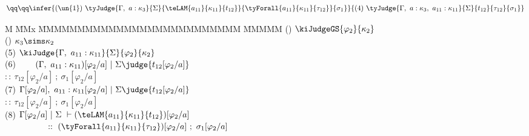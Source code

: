 \begin{flushleft}
\bigskip
$$
\qq \qq	\infer
	{ (\un{1}) \
	  \tyJudge
		{\Gamma, \ a : \kappa_3}
		{\Sigma}
		{\teLAM{a_{11}}{\kappa_{11}}{t_{12}}}
		{\tyForall{a_{11}}{\kappa_{11}}{\tau_{12}}}
		{\sigma_1}
	}
	{ (4) \
	  \tyJudge
	  	{\Gamma, \ a : \kappa_3, \ a_{11} : \kappa_{11}}
		{\Sigma}
		{t_{12}}
		{\tau_{12}}
		{\sigma_1}
	}
$$
\begin{tabbing}
M \= MMx \= MMMMMMMMMMMMMMMMMMMMMMMMMM \= MMMMM  \kill
\>	(\un{2}) 
		\> $\kiJudgeGS{\varphi_2}{\kappa_2}$
		\> 
\\[1ex]
\>	() 
		\> $\kappa_3 \sims \kappa_2$
		\> 
\\[1ex]
\>	(5) 	\> $\kiJudge
			{\Gamma, \ a_{11} : \kappa_{11}}
			{\Sigma}
			{\varphi_2}
			{\kappa_2}$
		\> 
\\[1ex]
\>	(6) 	\> $\ \ \ \ \ \: 
			{(\Gamma, \  a_{11} : \kappa_{11})[\varphi_2/a]} 
			\ \vert \ 	{\Sigma} 
			\judge 		{t_{12}[\varphi_2/a]}$
\\[0.2ex]
\>		\> \hspace{12em}	
			$:: \	{\tau_{12}[\varphi_2/a]}
			 \ ; \  {\sigma_1[\varphi_2/a]}$
		\> 
\\[1ex]
\>	(7)	\> $	{\Gamma[\varphi_2/a], \ a_{11} : \kappa_{11}[\varphi_2/a]} 
			\ \vert \ 	{\Sigma}
			\judge 		{t_{12}[\varphi_2/a]}$
\\[0.2ex]
\>		\> \hspace{12em}
			$:: \	{\tau_{12}[\varphi_2/a]}
			 \ ; \	{\sigma_1[\varphi_2/a]}$
		\> 
\\[1ex]
\>	(8)	\> ${\Gamma[\varphi_2/a]} \ \arrowvert \ {\Sigma} \ \vdash
			{(\teLAM
				{a_{11}}
				{\kappa_{11}}
				{t_{12}})
				[\varphi_2/a]
			}$
\\[1ex]
\>		\> $\hspace{5em}
			:: \
			{(\tyForall 
				{a_{11}}
				{\kappa_{11}}
				{\tau_{12}})
				[\varphi_2/a]
			}
			\ ; \ 
			{\sigma_1[\varphi_2/a]}$
		\> 
\end{tabbing}



\end{flushleft}

